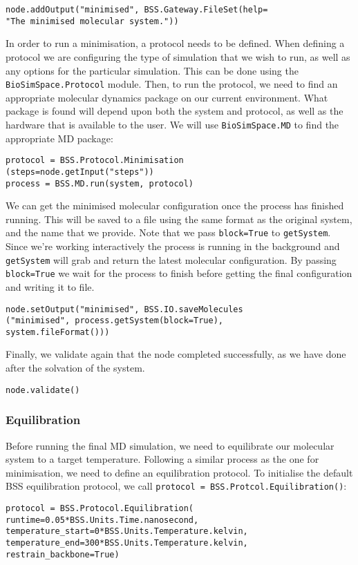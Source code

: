 \documentclass[9pt,tutorial]{livecoms}
\begin{document}
\begin{verbatim}
node.addOutput("minimised", BSS.Gateway.FileSet(help=
"The minimised molecular system."))
\end{verbatim}

In order to run a minimisation, a protocol needs to be defined. When defining a protocol we are configuring the type of simulation that we wish to run, as well as any options for the particular simulation. This can be done using the \texttt{BioSimSpace.Protocol} module.  Then, to run the protocol, we need to find an appropriate molecular dynamics package on our current environment. What package is found will depend upon both the system and protocol, as well as the hardware that is available to the user. We will use \texttt{BioSimSpace.MD} to find the appropriate MD package: 

\begin{verbatim}
protocol = BSS.Protocol.Minimisation
(steps=node.getInput("steps"))
process = BSS.MD.run(system, protocol)
\end{verbatim}

We can get the minimised molecular configuration once the process has finished running. This will be saved to a file using the same format as the original system, and the name that we provide. Note that we pass \texttt{block=True} to \texttt{getSystem}. Since we're working interactively the process is running in the background and \texttt{getSystem} will grab and return the latest molecular configuration. By passing \texttt{block=True} we wait for the process to finish before getting the final configuration and writing it to file. 

\begin{verbatim}
node.setOutput("minimised", BSS.IO.saveMolecules
("minimised", process.getSystem(block=True),
system.fileFormat()))
\end{verbatim}

Finally, we validate again that the node completed successfully, as we have done after the solvation of the system.

\begin{verbatim}
node.validate()
\end{verbatim}

\subsubsection{Equilibration}

Before running the final MD simulation, we need to equilibrate our molecular system to a target temperature. Following a similar process as the one for minimisation, we need to define an equilibration protocol. To initialise the default BSS equilibration protocol, we call \texttt{protocol = BSS.Protcol.Equilibration()}: 
\begin{verbatim}
protocol = BSS.Protocol.Equilibration(
runtime=0.05*BSS.Units.Time.nanosecond, 
temperature_start=0*BSS.Units.Temperature.kelvin, 
temperature_end=300*BSS.Units.Temperature.kelvin, 
restrain_backbone=True)
\end{verbatim}
\end{document}
